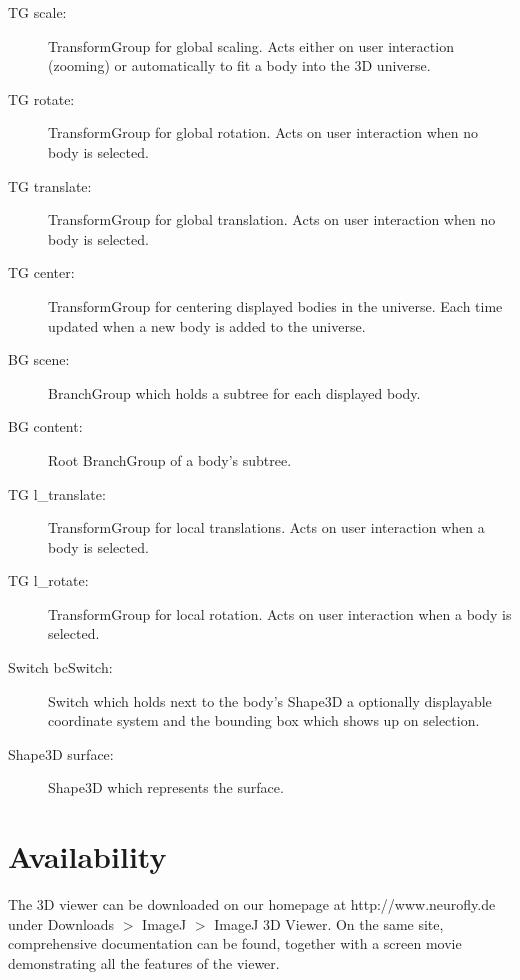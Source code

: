 \documentclass[a4paper,10pt]{article}
\begin{document}
\begin{description}
\item[TG scale:] TransformGroup for global scaling. Acts either on user interaction (zooming) or automatically to fit a body into the 3D universe.
\item[TG rotate:] TransformGroup for global rotation. Acts on user interaction when no body is selected.
\item[TG translate:] TransformGroup for global translation. Acts on user interaction when no body is selected.
\item[TG center:] TransformGroup for centering displayed bodies in the universe. Each time updated when a new body is added to the universe.
\item[BG scene:] BranchGroup which holds a subtree for each displayed body.
\item[BG content:] Root BranchGroup of a body's subtree.
\item[TG l\_translate:]  TransformGroup for local translations. Acts on user interaction when a body is selected.
\item[TG l\_rotate:] TransformGroup for local rotation. Acts on user interaction when a body is selected.
\item[Switch bcSwitch:] Switch which holds next to the body's Shape3D a optionally displayable coordinate system and the bounding box which shows up on selection.
\item[Shape3D surface:] Shape3D which represents the surface.
\end{description}



\section{Availability}
The 3D viewer can be downloaded on our homepage at http://www.neurofly.de under Downloads $>$ ImageJ $>$ ImageJ 3D Viewer. On the same site, comprehensive documentation can be found, together with a screen movie demonstrating all the features of the viewer.






\end{document}
